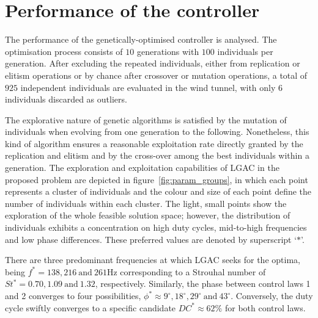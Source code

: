 \section{Performance of the controller \label{s:Results}}
%
The performance of the genetically-optimised controller is analysed. The optimisation process consists of $10$ generations with $100$ individuals per generation. After excluding the repeated individuals, either from replication or elitism operations or by chance after crossover or mutation operations, a total of $925$ independent individuals are evaluated in the wind tunnel, with only $6$ individuals discarded as outliers.

The explorative nature of genetic algorithms is satisfied by the mutation of individuals when evolving from one generation to the following. Nonetheless, this kind of algorithm ensures a reasonable exploitation rate directly granted by the replication and elitism and by the cross-over among the best individuals within a generation. The exploration and exploitation capabilities of LGAC in the proposed problem are depicted in figure~\ref{fig:param_groups}, in which each point represents a cluster of individuals and the colour and size of each point define the number of individuals within each cluster. The light, small points show the exploration of the whole feasible solution space; however, the distribution of individuals exhibits a concentration on high duty cycles, mid-to-high frequencies and low phase differences. These preferred values are denoted by superscript `\small{$*$}'. 

\normalsize There are three predominant frequencies at which LGAC seeks for the optima, being $f^* = 138, 216~\text{and}~261\mathrm{Hz}$ corresponding to a Strouhal number of $St^* = 0.70, 1.09~\text{and}~1.32$, respectively. Similarly, the phase between control laws 1 and 2 converges to four possibilities, $\phi^* \approx 9^\circ,18^\circ,29^\circ~\text{and}~43^\circ$. Conversely, the duty cycle swiftly converges to a specific candidate $DC^* \approx 62\%$ for both control laws.

